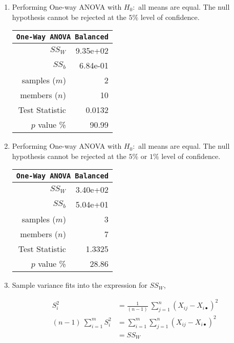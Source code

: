 \begin{enumerate}
	\item Performing One-way ANOVA with $ H_0 : $ all means are equal. The null hypothesis cannot be rejected at the $ 5\% $ level of confidence.
	
	\begin{table}[H]
		\centering
		\begin{tabular}{@{}rr@{}}
			\toprule
			\multicolumn{2}{c}{\texttt{One-Way ANOVA Balanced}} \\
			\midrule
			$SS_W$         &               9.35e+02 \\
			$SS_b$         &               6.84e-01 \\
			samples ($m$)  &                      2 \\
			members ($n$)  &                     10 \\
			Test Statistic &                 0.0132 \\
			$p$ value \%   &                  90.99 \\
			\bottomrule
		\end{tabular}
		\bigskip
	\end{table}

	\item Performing One-way ANOVA with $ H_0 : $ all means are equal. The null hypothesis cannot be rejected at the $ 5\% $ or $ 1\% $ level of confidence.
	
	\begin{table}[H]
		\centering
		\begin{tabular}{@{}rr@{}}
			\toprule
			\multicolumn{2}{c}{\texttt{One-Way ANOVA Balanced}} \\
			\midrule
			$SS_W$         &               3.40e+02 \\
			$SS_b$         &               5.04e+01 \\
			samples ($m$)  &                      3 \\
			members ($n$)  &                      7 \\
			Test Statistic &                 1.3325 \\
			$p$ value \%   &                  28.86 \\
			\bottomrule
		\end{tabular}
		\bigskip
	\end{table}

	\item Sample variance fits into the expression for $ SS_W $,
	
	
	\begin{align}
		S_i^2 &= \frac{1}{(n-1)}\ \sum\limits_{j = 1}^{n} (X_{ij} - X_{i\bullet})^2 \nonumber \\
		(n-1)\ \sum\limits_{i = 1}^{m} S_i^2 &= \sum\limits_{i = 1}^{m} \sum\limits_{j = 1}^{n} (X_{ij} - X_{i\bullet})^2 \\
		&= SS_W \nonumber
	\end{align}


\end{enumerate}
